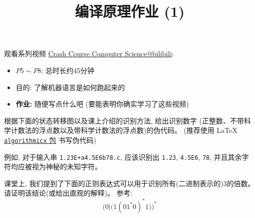 \documentclass[a4paper, justified]{tufte-handout}
\title{编译原理作业 (1)}
\date{\zhtoday}
\begin{document}
\maketitle
\noplagiarism %
\begin{abstract}
\end{abstract}
\beginrequired
\begin{problem}
  观看系列视频 \href{https://www.bilibili.com/video/BV1EW411u7th?}{Crash Course Computer Science@bilibili}:
  \begin{itemize}
    \item $P5 \sim P8$; 总时长约45分钟
    \item 目的: 了解机器语言是如何跑起来的
    \item {\bf 作业:} 随便写点什么吧 (要能表明你确实学习了这些视频)
  \end{itemize}
\end{problem}

\begin{solution}
\end{solution}

\begin{problem}
  根据下面的状态转移图以及课上介绍的识别方法, 给出识别数字
  (正整数、不带科学计数法的浮点数以及带科学计数法的浮点数)的伪代码。
  (推荐使用 \LaTeX{}
  \href{http://tug.ctan.org/macros/latex/contrib/algorithmicx/algorithmicx.pdf}{\texttt{algorithmicx} 包}
  书写伪代码)


  例如, 对于输入串 \texttt{1.23E+a4.5E6b78.c},
  应该识别出 \texttt{1.23}, \texttt{4.5E6}, \texttt{78},
  并且其余字符均应被视为神秘的未知字符。
\end{problem}

\begin{solution}
\end{solution}

\begin{problem}
  课堂上, 我们提到了下面的正则表达式可以用于识别所有(二进制表示的)3的倍数。
  请证明该结论(或给出直观的解释)。
  参考: 
  \[
    \Big(0|\big(1(01^{\ast}0)^{\ast}1\big)\Big)^{\ast}
  \]
\end{problem}
\end{document}
